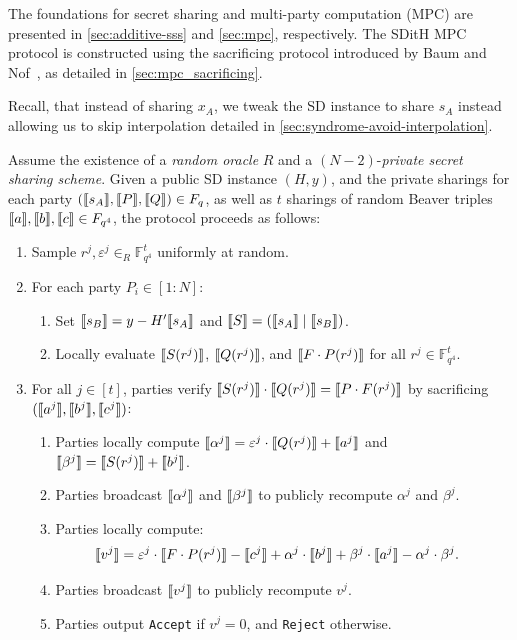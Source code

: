 \documentclass[11pt]{report}
\theoremstyle{definition}
\theoremstyle{plain}
\begin{document}
The foundations for secret sharing and multi-party computation (MPC) are presented in \autoref{sec:additive-sss} and \autoref{sec:mpc}, respectively. The SDitH MPC protocol is constructed using the sacrificing protocol introduced by Baum and Nof~\cite{baum2020concretely}, as detailed in \autoref{sec:mpc_sacrificing}.

Recall, that instead of sharing $x_A$, we tweak the SD instance to share $s_A$ instead allowing us to skip interpolation detailed in \autoref{sec:syndrome-avoid-interpolation}.

\begin{protocol}\label{def:sdith-mpc}
  Assume the existence of a \textit{random oracle} $R$ and a $(N-2)$-\textit{private secret sharing scheme}. Given a public SD instance $(H, y)$, and the private sharings for each party $(\llbracket s_A \rrbracket, \llbracket P \rrbracket, \llbracket Q \rrbracket) \in F_q$, as well as $t$ sharings of random Beaver triples $\llbracket a \rrbracket, \llbracket b \rrbracket, \llbracket c \rrbracket \in F_{q^4}$, the protocol proceeds as follows:
  \begin{enumerate}
    \item Sample $r^j, \varepsilon^j \in_R \mathbb{F}_{q^4}^t$ uniformly at random.
    \item For each party $P_i \in [1 : N]$:
          \begin{enumerate}
            \item Set $\llbracket s_B \rrbracket = y - H' \llbracket s_A \rrbracket$ and $\llbracket S \rrbracket = (\llbracket s_A \rrbracket \mid \llbracket s_B \rrbracket)$.\label{step:sdith-mpc-lagrange-interpolation}
            \item Locally evaluate $\llbracket S(r^j) \rrbracket$, $\llbracket Q(r^j) \rrbracket$, and $\llbracket F \cdot P(r^j) \rrbracket$ for all $r^j \in \mathbb{F}_{q^4}^t$.
          \end{enumerate}
    \item For all $j \in [t]$, parties verify $\llbracket S(r^j) \rrbracket \cdot \llbracket Q(r^j) \rrbracket = \llbracket P \cdot F(r^j) \rrbracket$ by sacrificing \\$(\llbracket a^j \rrbracket, \llbracket b^j \rrbracket, \llbracket c^j \rrbracket)$:
          \begin{enumerate}[topsep=0pt]
            \item Parties locally compute $\llbracket \alpha^j \rrbracket  = \varepsilon^j \cdot \llbracket Q(r^j) \rrbracket + \llbracket a^j \rrbracket$ and $ \llbracket \beta^j \rrbracket  = \llbracket S(r^j) \rrbracket + \llbracket b^j \rrbracket$.
            \item Parties broadcast $\llbracket \alpha^j \rrbracket$ and $\llbracket \beta^j \rrbracket$ to publicly recompute $\alpha^j$ and $\beta^j$.
            \item Parties locally compute:
                  \begin{align*}
                    \llbracket v^j \rrbracket & = \varepsilon^j \cdot \llbracket F \cdot P(r^j) \rrbracket - \llbracket c^j \rrbracket + \alpha^j \cdot \llbracket b^j \rrbracket + \beta^j \cdot \llbracket a^j \rrbracket - \alpha^j \cdot \beta^j.
                  \end{align*}
            \item Parties broadcast $\llbracket v^j \rrbracket$ to publicly recompute $v^j$.
            \item Parties output \texttt{Accept} if $v^j = 0$, and \texttt{Reject} otherwise.
          \end{enumerate}
  \end{enumerate}
\end{protocol}
\end{document}
